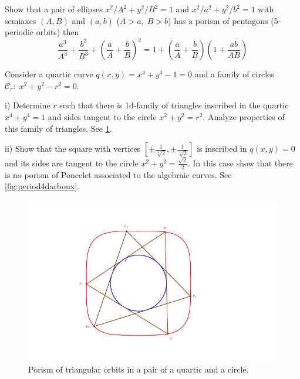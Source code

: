 \begin{exercise}\label{ex:21} Show that a pair of   ellipses $x^2/A^2+y^2/B^2=1$ and $x^2/a^2+y^2/b^2=1$ with semiaxes $(A,B)$ and $(a,b)$ ($A>a,\;B>b$) has a porism of pentagons (5-periodic orbits) then
\[\frac{a^3}{A^3}+\frac{b^3}{B^3}+\left(\frac{a}{A}+\frac{b}{B}\right)^2=1+\left(\frac{a}{A}+\frac{b}{B}\right)\left(1+\frac{ab}{AB}\right)\]\end{exercise}

\begin{exercise}\label{ex:22} Consider a quartic curve $q(x,y)=x^4+y^4-1=0$ and a family of circles $\mathcal{C}_r:  \; x^2+y^2-r^2=0$.

\noindent i) Determine $r$ such that there is  1d-family of triangles inscribed in the quartic $x^4+y^4=1$ and sides tangent to the circle $x^2+y^2=r^2$. Analyze   properties of this family of triangles. See   \cref{fig:darbouxq4c2}.

\noindent ii) Show that the square with vertices $[\pm \frac{1}{\sqrt[4]{2}},\pm \frac{1}{\sqrt[4]{2}}]$ is inscribed in $ q(x,y)=0$ and its sides are tangent to the circle $x^2+y^2=\frac{\sqrt{2}}{2}.$ In this case show that there is no porism of Poncelet associated to the algebraic curves. See \cref{fig:period4darboux}.

\begin{figure}
    \centering
    \includegraphics[scale=0.6]{pics_tex/darboux_Q4_C2.pdf}
    \caption{Porism of triangular orbits in a pair of a quartic and a circle.}
    \label{fig:darbouxq4c2}
\end{figure}



\end{exercise}
